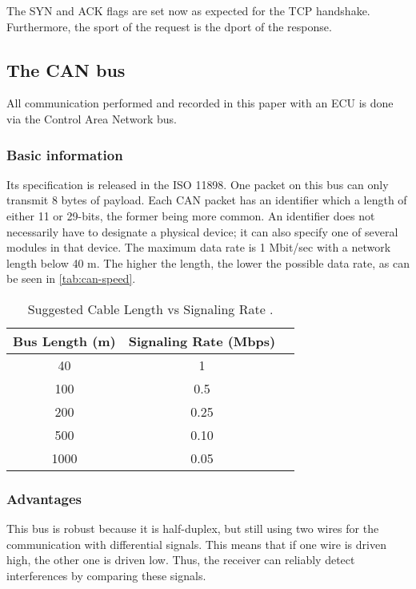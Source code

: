 The SYN and ACK flags are set now as expected for the TCP handshake. Furthermore, the sport of the request is the dport of the response.


\subsection{The CAN bus}

All communication performed and recorded in this paper with an ECU is done via the Control Area Network bus.

\subsubsection{Basic information}

 Its specification is released in the ISO 11898. One packet on this bus can only transmit 8 bytes of payload.
 Each CAN packet has an identifier which a length of either 11 or 29-bits, the former being more common. An identifier does not necessarily have to designate a physical device; it can also specify one of several modules in that device.
 The maximum data rate is 1 Mbit/sec with a network length below 40 m. The higher the length, the lower the possible data rate, as can be seen in \autoref{tab:can-speed}.

\begin{table}[h]
    \centering
    \begin{tabular}{|c|c|c|}
    \hline
    \textbf{Bus Length (m)} & \textbf{Signaling Rate (Mbps)}\\
    \hline
    40 & 1 \\
    \hline
    100 & 0.5 \\
    \hline
    200 & 0.25 \\
    \hline
    500 & 0.10 \\
    \hline
    1000 & 0.05 \\
    \hline
\end{tabular}
\caption{Suggested Cable Length vs Signaling Rate \cite{slla270}.}
\label{tab:can-speed}
\end{table}

\subsubsection{Advantages}

This bus is robust because it is half-duplex, but still using two wires for the communication with differential signals. This means that if one wire is driven high, the other one is driven low. Thus, the receiver can reliably detect interferences by comparing these signals.

